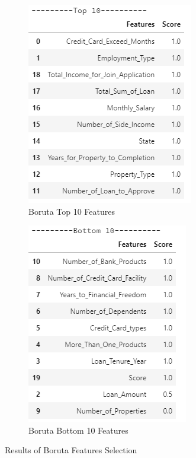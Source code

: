 \documentclass[11pt]{article}
\begin{document}
\begin{figure}[ht]
\begin{subfigure}{0.5\textwidth}
\includegraphics[scale=0.65]{BorutaTop10.PNG} 
\caption{Boruta Top 10 Features}
\label{fig:borutaTop10}
\end{subfigure}
\begin{subfigure}{0.5\textwidth}
\includegraphics[scale=0.65]{BorutaBot10.PNG}
\caption{Boruta Bottom 10 Features}
\label{fig:borutaBot10}
\end{subfigure}
\label{fig:boruta}
\caption{Results of Boruta Features Selection}
\end{figure}
\end{document}
